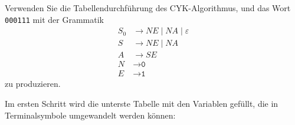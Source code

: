 Verwenden Sie die Tabellendurchführung des CYK-Algorithmus, und
das Wort \texttt{000111} mit der Grammatik
\begin{align*}
S_0& \to NE \mid NA \mid \varepsilon \\
S  & \to NE \mid NA \\
A  &\to SE \\
N&\to \texttt{0} \\
E&\to \texttt{1} 
\end{align*}
zu produzieren.


\begin{loesung}
\def\h{1.0}
\def\punkt#1#2{({(#1)*\h},{(#2)*\h})}
\def\tabelle{
	\draw \punkt{0}{0} -- \punkt{6}{0};
	\foreach \x in {1,...,6}{
		\draw \punkt{0}{\x} -- \punkt{7-\x}{\x};
	}
	\draw \punkt{0}{0} -- \punkt{0}{6};
	\foreach \x in {1,...,6}{
		\draw \punkt{\x}{0} -- \punkt{\x}{7-\x};
	}
	\node at \punkt{0.5}{-0.5} {\texttt{0}};
	\node at \punkt{1.5}{-0.5} {\texttt{0}};
	\node at \punkt{2.5}{-0.5} {\texttt{0}};
	\node at \punkt{3.5}{-0.5} {\texttt{1}};
	\node at \punkt{4.5}{-0.5} {\texttt{1}};
	\node at \punkt{5.5}{-0.5} {\texttt{1}};
	\draw[decorate,decoration={calligraphic brace},thick]
		\punkt{6}{-1} -- \punkt{0}{-1};
	\node at \punkt{3}{-1.5} {$w$};
}
\def\terminal#1#2#3{
	\draw[->,color=red,line width=1.4pt,shorten >= 0.3cm,shorten <= 0.3cm]
		\punkt{#1-0.5}{#2-0.5} -- ++\punkt{0}{-1};
	\node at \punkt{#1-0.5}{#2-0.5}{#3};
}
\def\zeichen#1#2#3#4{
	\draw[->,color=red,line width=1.4pt,shorten >= 0.2cm,shorten <= 0.2cm]
		\punkt{#1-0.5}{#2-0.5} -- ++\punkt{0}{-#4};
	\draw[->,color=red,line width=1.4pt,shorten >= 0.28cm,shorten <= 0.28cm]
		\punkt{#1-0.5}{#2-0.5} -- ++\punkt{#2-#4}{#4-#2};
	\node at \punkt{#1-0.5}{#2-0.5}{#3};
}
\def\keinzeichen#1#2{
	\fill[color=gray!40] \punkt{#1}{#2}
		-- ++\punkt{-1}{0}
		-- ++\punkt{0}{-1}
		-- ++\punkt{1}{0} -- cycle;
}
\def\lineone{
	\terminal{1}{1}{$N$}
	\terminal{2}{1}{$N$}
	\terminal{3}{1}{$N$}
	\terminal{4}{1}{$E$}
	\terminal{5}{1}{$E$}
	\terminal{6}{1}{$E$}
}
\def\linetwo{
	\keinzeichen{1}{2}
	\keinzeichen{2}{2}
	\zeichen{3}{2}{$S_0,S$}{1}
	\keinzeichen{4}{2}
	\keinzeichen{5}{2}
}
\def\linethree{
	\keinzeichen{1}{3}
	\keinzeichen{2}{3}
	\zeichen{3}{3}{$A$}{1}
	\keinzeichen{4}{3}
}
\def\linefour{
	\keinzeichen{1}{4}
	\zeichen{2}{4}{$S_0,S$}{3}
	\keinzeichen{3}{4}
}
\def\linefive{
	\keinzeichen{1}{5}
	\zeichen{2}{5}{$A$}{1}
}
\def\linesix{
	\zeichen{1}{6}{$S_0,S$}{5}
}
Im ersten Schritt wird die unterste Tabelle mit den Variablen
gefüllt, die in Terminalsymbole umgewandelt werden können:

\end{loesung}
